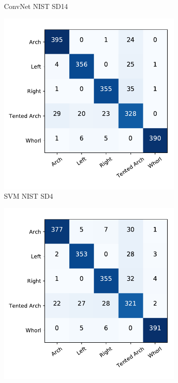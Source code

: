 \begin{figure}[!ht]
\begin{subfigure}[b]{0.25\textwidth}
		\caption{ConvNet NIST SD14 }
		\label{fig.cnf_matrix_5class.net_sd14}
	\end{subfigure}%
	\begin{subfigure}[b]{0.25\textwidth}
		\centering
		\includegraphics[width=\linewidth]{fig/figs/confusion_matrix_svm_sd4_cross_subject.pdf}
		\caption{SVM NIST SD4 }
		\label{fig.cnf_matrix_5class.svm_sd4}
	\end{subfigure}%
	\begin{subfigure}[b]{0.25\textwidth}
		\centering
		\includegraphics[width=\linewidth]{fig/figs/confusion_matrix_net_sd4_cross_subject.pdf}

\end{subfigure}
\end{figure}
